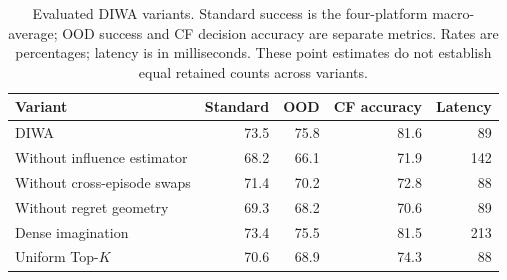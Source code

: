 \begin{table}[t]
\centering
\caption{Evaluated DIWA variants. Standard success is the four-platform macro-average; OOD success and CF decision accuracy are separate metrics. Rates are percentages; latency is in milliseconds. These point estimates do not establish equal retained counts across variants.}
\label{tab:ablation}
\small
\begin{tabular}{lrrrr}
\toprule
Variant & Standard & OOD & CF accuracy & Latency\\
\midrule
DIWA & 73.5 & 75.8 & 81.6 & 89\\
Without influence estimator & 68.2 & 66.1 & 71.9 & 142\\
Without cross-episode swaps & 71.4 & 70.2 & 72.8 & 88\\
Without regret geometry & 69.3 & 68.2 & 70.6 & 89\\
Dense imagination & 73.4 & 75.5 & 81.5 & 213\\
Uniform Top-$K$ & 70.6 & 68.9 & 74.3 & 88\\
\bottomrule
\end{tabular}
\end{table}
